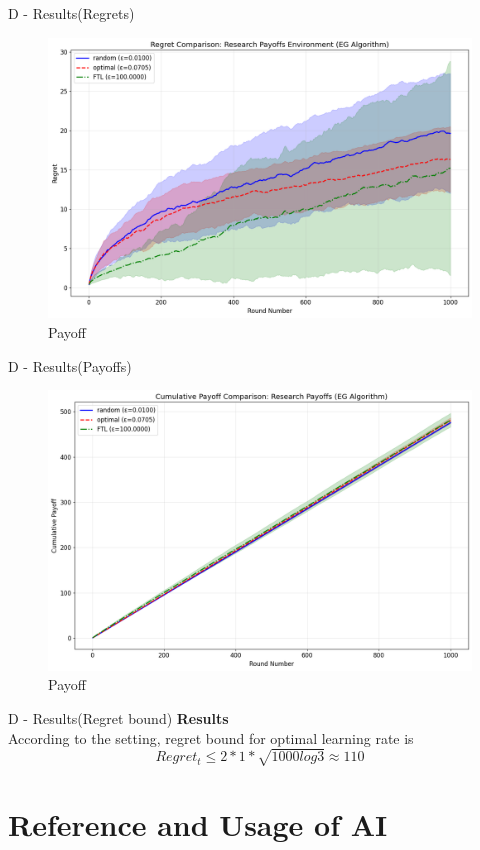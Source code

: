 \documentclass{beamer}
\begin{document}
\begin{frame}{D - Results(Regrets)}
\begin{figure}
    \centering
    \includegraphics[width=0.5\linewidth]{332Project2/figures/RP_regret.png}
    \caption{Payoff}
    \label{fig:placeholder}
\end{figure}
    
\end{frame}

\begin{frame}{D - Results(Payoffs)}
\begin{figure}
    \centering
    \includegraphics[width=0.5\linewidth]{332Project2/figures/RP_payoff.png}
    \caption{Payoff}
    \label{fig:placeholder}
\end{figure}
    
\end{frame}

\begin{frame}{D - Results(Regret bound)}
\textbf{Results}\\
    According to the setting, regret bound for optimal learning rate is
    \[
    Regret_t \leq 2 * 1 * \sqrt{1000log3} \approx 110
    \]
\end{frame}

\section{Reference and Usage of AI}
\end{document}
